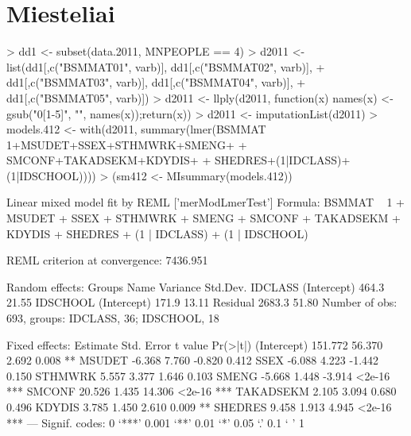 \documentclass[a4paper]{article}
\begin{document}
\section{Miesteliai}
\begin{Schunk}
\begin{Sinput}
> dd1 <- subset(data.2011, MNPEOPLE == 4)
> d2011 <- list(dd1[,c("BSMMAT01", varb)], dd1[,c("BSMMAT02", varb)], 
+               dd1[,c("BSMMAT03", varb)], dd1[,c("BSMMAT04", varb)],
+               dd1[,c("BSMMAT05", varb)])
> d2011 <- llply(d2011, function(x) {names(x) <- gsub("0[1-5]", "", names(x));return(x)})
> d2011 <- imputationList(d2011)
> models.412 <- with(d2011, summary(lmer(BSMMAT ~ 1+MSUDET+SSEX+STHMWRK+SMENG+
+                                          SMCONF+TAKADSEKM+KDYDIS+
+                                          SHEDRES+(1|IDCLASS)+(1|IDSCHOOL))))
> (sm412 <- MIsummary(models.412))
\end{Sinput}
\begin{Soutput}
Linear mixed model fit by REML ['merModLmerTest']
Formula: BSMMAT ~ 1 + MSUDET + SSEX + STHMWRK + SMENG + SMCONF + TAKADSEKM +      KDYDIS + SHEDRES + (1 | IDCLASS) + (1 | IDSCHOOL) 

REML criterion at convergence: 7436.951 

Random effects:
 Groups   Name        Variance Std.Dev.
 IDCLASS  (Intercept)  464.3   21.55   
 IDSCHOOL (Intercept)  171.9   13.11   
 Residual             2683.3   51.80   
Number of obs: 693, groups: IDCLASS, 36; IDSCHOOL, 18

Fixed effects:
            Estimate Std. Error t value Pr(>|t|)    
(Intercept)  151.772     56.370   2.692    0.008 ** 
MSUDET        -6.368      7.760  -0.820    0.412    
SSEX          -6.088      4.223  -1.442    0.150    
STHMWRK        5.557      3.377   1.646    0.103    
SMENG         -5.668      1.448  -3.914   <2e-16 ***
SMCONF        20.526      1.435  14.306   <2e-16 ***
TAKADSEKM      2.105      3.094   0.680    0.496    
KDYDIS         3.785      1.450   2.610    0.009 ** 
SHEDRES        9.458      1.913   4.945   <2e-16 ***
---
Signif. codes:  0 ‘***’ 0.001 ‘**’ 0.01 ‘*’ 0.05 ‘.’ 0.1 ‘ ’ 1


\end{Soutput}
\end{Schunk}
\end{document}
